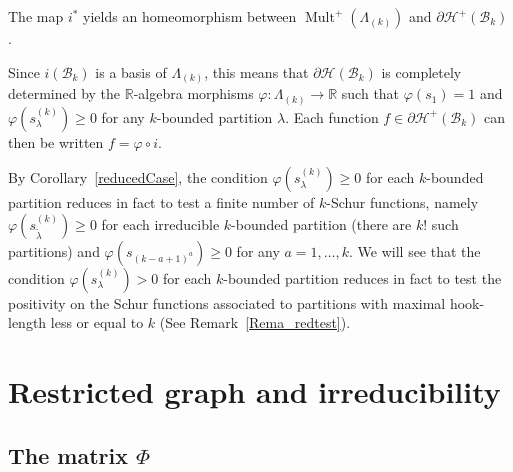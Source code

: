 \documentclass[ALCO,ThmDefs,Unicode,epreuves]{cedram}
\DeclareMathOperator{\Mult}{Mult}
\begin{document}
\begin{prop}
\label{multiGraphExtreme}The map $i^{\ast}$ yields an homeomorphism between
$\Mult ^{+}(\Lambda_{(k)})$ and $\partial\mathcal{H}^{+}(\mathcal{B}%
_{k})$. 
\end{prop}

Since $i(\mathcal{B}_{k})$ is a basis of $\Lambda_{(k)}$, this means that
$\partial\mathcal{H}(\mathcal{B}_{k})$ is completely determined by the
$\mathbb{R}$-algebra morphisms $\varphi:\Lambda_{(k)}\rightarrow\mathbb{R}$
such that $\varphi(s_{1})=1$ and $\varphi(s_{\lambda}^{(k)})\geq0$ for any
$k$-bounded partition $\lambda$. Each function $f\in\partial\mathcal{H}%
^{+}(\mathcal{B}_{k})$ can then be written $f=\varphi\circ i$.

By Corollary~\ref{reducedCase}, the condition $\varphi(s_{\lambda}^{(k)}%
)\geq0$ for each $k$-bounded partition reduces in fact to test a finite number
of $k$-Schur functions, namely $\varphi(s_{\widetilde{\lambda}}^{(k)})\geq0$
for each irreducible $k$-bounded partition (there are $k!$ such
partitions) and $\varphi(s_{(k-a+1)^{a}})\geq0$ for any $a=1,\ldots,k$. We
will see that the condition $\varphi(s_{\lambda}^{(k)})>0$ for each
$k$-bounded partition reduces in fact to test the positivity on the Schur
functions associated to partitions with maximal hook-length less or equal to
$k$ (See Remark~\ref{Rema_redtest}).

\section{Restricted graph and irreducibility}\label{section3}

\subsection{The matrix \texorpdfstring{$\Phi$}{Phi}}
\end{document}
